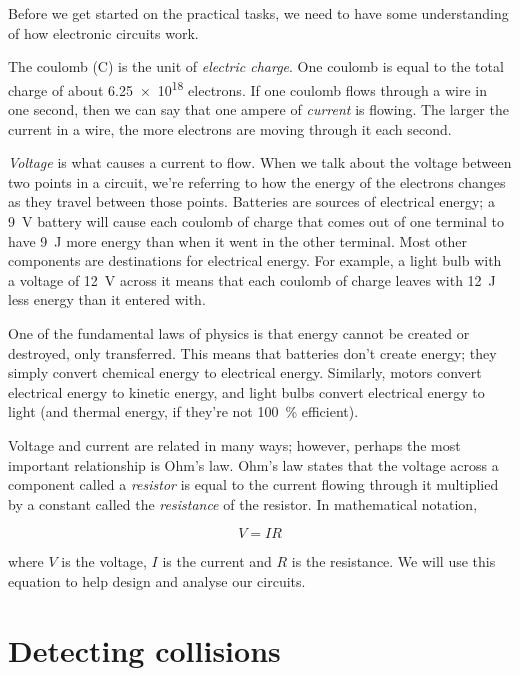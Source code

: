 \documentclass{article}
\begin{document}
Before we get started on the practical tasks, we need to have some understanding
of how electronic circuits work.

The coulomb (\si{\coulomb}) is the unit of \emph{electric charge}. One coulomb
is equal to the total charge of about \num{6.25e18} electrons. If one coulomb
flows through a wire in one second, then we can say that one ampere of
\emph{current} is flowing. The larger the current in a wire, the more electrons
are moving through it each second.

\emph{Voltage} is what causes a current to flow. When we talk about the voltage
between two points in a circuit, we're referring to how the energy of the
electrons changes as they travel between those points. Batteries are sources
of electrical energy; a \SI{9}{\volt} battery will cause each coulomb of charge
that comes out of one terminal to have \SI{9}{\joule} more energy than when it
went in the other terminal. Most other components are destinations for
electrical energy. For example, a light bulb with a voltage of \SI{12}{\volt}
across it means that each coulomb of charge leaves with \SI{12}{\joule} less
energy than it entered with.

One of the fundamental laws of physics is that energy cannot be created or
destroyed, only transferred. This means that batteries don't create energy;
they simply convert chemical energy to electrical energy. Similarly, motors
convert electrical energy to kinetic energy, and light bulbs convert electrical
energy to light (and thermal energy, if they're not \SI{100}{\percent}
efficient).

Voltage and current are related in many ways; however, perhaps the most
important relationship is Ohm's law. Ohm's law states that the voltage across
a component called a \emph{resistor} is equal to the current flowing through it
multiplied by a constant called the \emph{resistance} of the resistor. In
mathematical notation,

\begin{equation*}
V = I R
\end{equation*}

where $V$ is the voltage, $I$ is the current and $R$ is the resistance. We will
use this equation to help design and analyse our circuits.

\newpage

\section{Detecting collisions}
\end{document}
